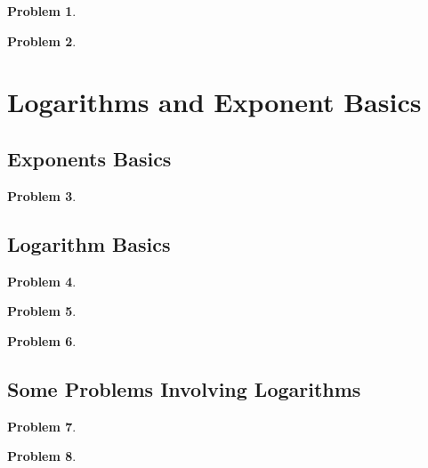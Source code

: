 \documentclass{article}
\newtheorem{problem}{Problem}
\begin{document}
\begin{problem}

\end{problem}


\begin{problem}

\end{problem}


\section{Logarithms and Exponent Basics}
\subsection{Exponents Basics}
\begin{problem}

\end{problem}

\subsection{Logarithm Basics}
\begin{problem}

\end{problem}

\begin{problem}

\end{problem}

\begin{problem}

\end{problem}

\subsection{Some Problems Involving Logarithms}
\begin{problem}

\end{problem}

\begin{problem}

\end{problem}

\end{document}
